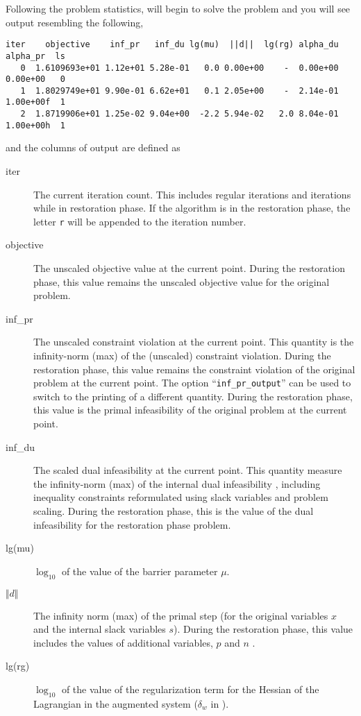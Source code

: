 Following the problem statistics, \IPOPT will begin to solve the problem and you will see output resembling the following,
\begin{verbatim}
iter    objective    inf_pr   inf_du lg(mu)  ||d||  lg(rg) alpha_du alpha_pr  ls
   0  1.6109693e+01 1.12e+01 5.28e-01   0.0 0.00e+00    -  0.00e+00 0.00e+00   0
   1  1.8029749e+01 9.90e-01 6.62e+01   0.1 2.05e+00    -  2.14e-01 1.00e+00f  1
   2  1.8719906e+01 1.25e-02 9.04e+00  -2.2 5.94e-02   2.0 8.04e-01 1.00e+00h  1
\end{verbatim}
and the columns of output are defined as
\begin{description}
\item[iter]
The current iteration count.
This includes regular iterations and iterations while in restoration phase.
If the algorithm is in the restoration phase, the letter \texttt{r} will be appended to the iteration number.
\item[objective]
The unscaled objective value at the current point.
During the restoration phase, this value remains the unscaled objective value for the original problem.
\item[inf\_pr]
The unscaled constraint violation at the current point.
This quantity is the infinity-norm (max) of the (unscaled) constraint violation.
During the restoration phase, this value remains the constraint violation of the original problem at the current point.
The option ``\texttt{inf\_pr\_output}'' can be used to switch to the printing of a different quantity.
During the restoration phase, this value is the primal infeasibility of the original problem at the current point.
\item[inf\_du]
The scaled dual infeasibility at the current point.
This quantity measure the infinity-norm (max) of the internal dual infeasibility \cite[Eq.~(4a)]{WaBi2006}, including inequality constraints reformulated using slack variables and problem scaling.
During the restoration phase, this is the value of the dual infeasibility for the restoration phase problem.
\item[lg(mu)]
$\log_{10}$ of the value of the barrier parameter $\mu$.
\item[$\Vert d\Vert$]
The infinity norm (max) of the primal step (for the original variables $x$ and the internal slack variables $s$).
During the restoration phase, this value includes the values of additional variables, $p$ and $n$ \cite[Eq.~(10)]{WaBi2006}.
\item[lg(rg)]
$\log_{10}$ of the value of the regularization term for the Hessian of the Lagrangian in the augmented system ($\delta_w$ in \cite[Eq.~(26)]{WaBi2006}).

\end{description}
